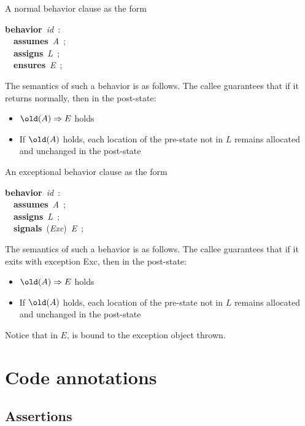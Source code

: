 \documentclass[a4paper,11pt,twoside,openright]{report}
\begin{document}
A normal behavior clause as the form
\begin{flushleft}\ttfamily\upshape\parindent 0pt
\begin{slshape}\color{blue}\textbf{behavior}~\textsl{id}~:~\\
~~\textbf{assumes}~\textsl{A}~;~\\
~~\textbf{assigns}~\textsl{L}~;~\\
~~\textbf{ensures}~\textsl{E}~;~\end{slshape}
\end{flushleft}
The semantics of such a behavior is as follows. The callee guarantees
that if it returns normally, then in the post-state:
\begin{itemize}
\item $\bskw{old}(A) \Rightarrow E$ holds
\item If $\bskw{old}(A)$ holds, each location of the pre-state not
  in $L$ remains allocated and unchanged in
  the post-state
\end{itemize}

An exceptional behavior clause as the form
\begin{flushleft}\ttfamily\upshape\parindent 0pt
\begin{slshape}\color{blue}\textbf{behavior}~\textsl{id}~:~\\
~~\textbf{assumes}~\textsl{A}~;~\\
~~\textbf{assigns}~\textsl{L}~;~\\
~~\textbf{signals}~(\textsl{Exc})~\textsl{E}~;~\end{slshape}
\end{flushleft}
The semantics of such a behavior is as follows. The callee guarantees
that if it exits with exception Exc, then in the post-state:
\begin{itemize}
\item $\bskw{old}(A) \Rightarrow E$ holds
\item If $\bskw{old}(A)$ holds, each location of the pre-state not
  in $L$ remains allocated and unchanged in
  the post-state
\end{itemize}
Notice that in $E$,  is bound to the exception object thrown.


\section{Code annotations}

\subsection{Assertions}
\end{document}
